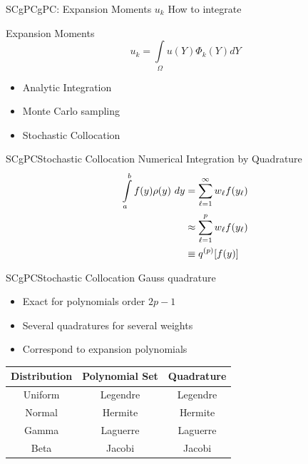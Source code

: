 \documentclass{beamer}
\begin{document}
\begin{frame}{SCgPC}{gPC: Expansion Moments $u_k$}\vspace{-20pt}
  \vfill
  How to integrate
  \begin{alertblock}{Expansion Moments}
    \[u_k = \int\limits_\Omega u(Y)\Phi_k(Y) dY\]
  \end{alertblock}
  \vfill
  \begin{itemize}
    \item Analytic Integration
  \vfill
    \item Monte Carlo sampling
  \vfill
    \item Stochastic Collocation
  \end{itemize}
  \vfill
\end{frame}


\begin{frame}{SCgPC}{Stochastic Collocation}\vspace{-20pt}
  Numerical Integration by Quadrature
  \begin{align*}
    \int\limits_a^b f(y) \rho(y)\ dy &= \sum_{\ell=1}^\infty w_\ell f(y_\ell) \\
      &\approx \sum_{\ell=1}^p w_\ell f(y_\ell) \\
      & \equiv q^{(p)}\qty[f(y)]
  \end{align*}
  \vfill
\end{frame}

\begin{frame}{SCgPC}{Stochastic Collocation}\vspace{-20pt}
  Gauss quadrature
  \begin{itemize}
    \item Exact for polynomials order $2p-1$
    \item Several quadratures for several weights
    \item Correspond to expansion polynomials
  \end{itemize}
  \begin{table}[h!]
    \centering
    \begin{tabular}{c c c}
      Distribution & Polynomial Set & Quadrature\\ \hline
      Uniform & Legendre & Legendre\\
      Normal & Hermite & Hermite\\
      Gamma & Laguerre & Laguerre\\
      Beta & Jacobi & Jacobi
    \end{tabular}
  \end{table}
\end{frame}
\end{document}
